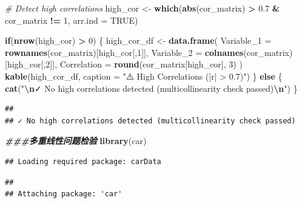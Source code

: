 \documentclass[
]{article}
\newenvironment{Shaded}{\begin{snugshade}}{\end{snugshade}}
\newcommand{\AttributeTok}[1]{\textcolor[rgb]{0.13,0.29,0.53}{#1}}
\newcommand{\CommentTok}[1]{\textcolor[rgb]{0.56,0.35,0.01}{\textit{#1}}}
\newcommand{\ConstantTok}[1]{\textcolor[rgb]{0.56,0.35,0.01}{#1}}
\newcommand{\ControlFlowTok}[1]{\textcolor[rgb]{0.13,0.29,0.53}{\textbf{#1}}}
\newcommand{\DecValTok}[1]{\textcolor[rgb]{0.00,0.00,0.81}{#1}}
\newcommand{\DocumentationTok}[1]{\textcolor[rgb]{0.56,0.35,0.01}{\textbf{\textit{#1}}}}
\newcommand{\FloatTok}[1]{\textcolor[rgb]{0.00,0.00,0.81}{#1}}
\newcommand{\FunctionTok}[1]{\textcolor[rgb]{0.13,0.29,0.53}{\textbf{#1}}}
\newcommand{\NormalTok}[1]{#1}
\newcommand{\OtherTok}[1]{\textcolor[rgb]{0.56,0.35,0.01}{#1}}
\newcommand{\SpecialCharTok}[1]{\textcolor[rgb]{0.81,0.36,0.00}{\textbf{#1}}}
\newcommand{\StringTok}[1]{\textcolor[rgb]{0.31,0.60,0.02}{#1}}
\begin{document}
\begin{Shaded}
\begin{Highlighting}[]
\CommentTok{\# Detect high correlations}
\NormalTok{high\_cor }\OtherTok{\textless{}{-}} \FunctionTok{which}\NormalTok{(}\FunctionTok{abs}\NormalTok{(cor\_matrix) }\SpecialCharTok{\textgreater{}} \FloatTok{0.7} \SpecialCharTok{\&}\NormalTok{ cor\_matrix }\SpecialCharTok{!=} \DecValTok{1}\NormalTok{, }\AttributeTok{arr.ind =} \ConstantTok{TRUE}\NormalTok{)}

\ControlFlowTok{if}\NormalTok{(}\FunctionTok{nrow}\NormalTok{(high\_cor) }\SpecialCharTok{\textgreater{}} \DecValTok{0}\NormalTok{) \{}
\NormalTok{  high\_cor\_df }\OtherTok{\textless{}{-}} \FunctionTok{data.frame}\NormalTok{(}
    \AttributeTok{Variable\_1 =} \FunctionTok{rownames}\NormalTok{(cor\_matrix)[high\_cor[,}\DecValTok{1}\NormalTok{]],}
    \AttributeTok{Variable\_2 =} \FunctionTok{colnames}\NormalTok{(cor\_matrix)[high\_cor[,}\DecValTok{2}\NormalTok{]],}
    \AttributeTok{Correlation =} \FunctionTok{round}\NormalTok{(cor\_matrix[high\_cor], }\DecValTok{3}\NormalTok{)}
\NormalTok{  )}
  \FunctionTok{kable}\NormalTok{(high\_cor\_df, }\AttributeTok{caption =} \StringTok{"⚠️ High Correlations (|r| \textgreater{} 0.7)"}\NormalTok{)}
\NormalTok{\} }\ControlFlowTok{else}\NormalTok{ \{}
  \FunctionTok{cat}\NormalTok{(}\StringTok{"}\SpecialCharTok{\textbackslash{}n}\StringTok{✓ No high correlations detected (multicollinearity check passed)}\SpecialCharTok{\textbackslash{}n}\StringTok{"}\NormalTok{)}
\NormalTok{\}}
\end{Highlighting}
\end{Shaded}

\begin{verbatim}
## 
## ✓ No high correlations detected (multicollinearity check passed)
\end{verbatim}

\begin{Shaded}
\begin{Highlighting}[]
\DocumentationTok{\#\#\#多重线性问题检验}
\FunctionTok{library}\NormalTok{(car)}
\end{Highlighting}
\end{Shaded}

\begin{verbatim}
## Loading required package: carData
\end{verbatim}

\begin{verbatim}
## 
## Attaching package: 'car'
\end{verbatim}
\end{document}
